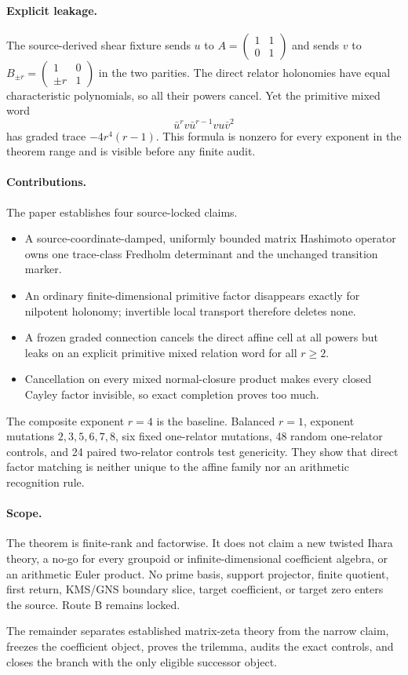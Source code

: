 \paragraph{Explicit leakage.}
The source-derived shear fixture sends $u$ to
$A=\left(\begin{smallmatrix}1&1\\0&1\end{smallmatrix}\right)$ and sends $v$
to $B_{\pm r}=\left(\begin{smallmatrix}1&0\\ \pm r&1\end{smallmatrix}\right)$
in the two parities.  The direct relator holonomies have equal characteristic
polynomials, so all their powers cancel.  Yet the primitive mixed word
\[
  \bar u^r v\bar u^{r-1}vu\bar v^2
\]
has graded trace $-4r^4(r-1)$.  This formula is nonzero for every exponent in
the theorem range and is visible before any finite audit.

\paragraph{Contributions.}
The paper establishes four source-locked claims.
\begin{itemize}
  \item A source-coordinate-damped, uniformly bounded matrix Hashimoto
  operator owns one trace-class Fredholm determinant and the unchanged
  transition marker.
  \item An ordinary finite-dimensional primitive factor disappears exactly
  for nilpotent holonomy; invertible local transport therefore deletes none.
  \item A frozen graded connection cancels the direct affine cell at all
  powers but leaks on an explicit primitive mixed relation word for all
  $r\ge2$.
  \item Cancellation on every mixed normal-closure product makes every closed
  Cayley factor invisible, so exact completion proves too much.
\end{itemize}

The composite exponent $r=4$ is the baseline.  Balanced $r=1$, exponent
mutations $2,3,5,6,7,8$, six fixed one-relator mutations, 48 random one-relator
controls, and 24 paired two-relator controls test genericity.  They show that
direct factor matching is neither unique to the affine family nor an
arithmetic recognition rule.

\paragraph{Scope.}
The theorem is finite-rank and factorwise.  It does not claim a new twisted
Ihara theory, a no-go for every groupoid or infinite-dimensional coefficient
algebra, or an arithmetic Euler product.  No prime basis, support projector,
finite quotient, first return, KMS/GNS boundary slice, target coefficient, or
target zero enters the source.  Route B remains locked.

The remainder separates established matrix-zeta theory from the narrow claim,
freezes the coefficient object, proves the trilemma, audits the exact controls,
and closes the branch with the only eligible successor object.

